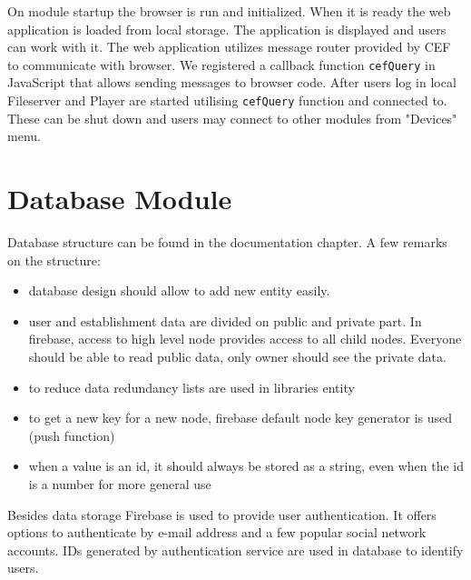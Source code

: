 On module startup the browser is run and initialized. When it is ready the web application is loaded from local storage. The application is displayed and users can work with it. The web application utilizes message router provided by CEF to communicate with browser. We registered a callback function \texttt{cefQuery} in JavaScript that allows sending messages to browser code. After users log in local Fileserver and Player are started utilising \texttt{cefQuery} function and connected to. These can be shut down and users may connect to other modules from "Devices" menu. 
\section{Database Module}

Database structure can be found in the documentation chapter. A few remarks on the
structure:
\begin{itemize}
    \item database design should allow to add new entity easily.
    \item user and establishment data are divided on public and private part. In firebase, access to high level node provides access to all child nodes. Everyone should be able to read public data, only owner should see the private data.
    \item to reduce data redundancy lists are used in libraries entity
    \item to get a new key for a new node, firebase default node key generator is used (push function)
    \item when a value is an id, it should always be stored as a string, even when the id is a number for more general use
\end{itemize}

\par
Besides data storage Firebase is used to provide user authentication. It offers options to authenticate by e-mail address and a few popular social network accounts. IDs generated by authentication service are used in database to identify users.